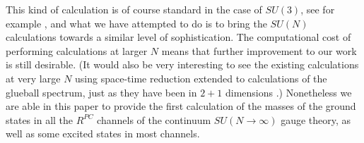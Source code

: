 \documentclass[12pt]{article}
\begin{document}
This kind of calculation is of course standard in the case of $SU(3)$, see for example
%
\cite{CMMT-1989,CM-UKQCD-1993,MP-1999,HM_Thesis,HMMT-2004,MP-2005,AAMT-2020},
%
and what we have attempted to do is to bring the $SU(N)$ calculations towards a similar level
of sophistication. The computational cost of performing calculations at larger
$N$ means that further improvement to our work is still desirable. 
(It would also be very interesting to see the existing calculations at very large $N$ using 
space-time reduction
%
\cite{MGPAGAMO-2020}
%
extended to calculations of the glueball spectrum, just as they have been in
$2+1$ dimensions
%
\cite{MGPAGAMKMO-2018}.)
%
Nonetheless we are able in this paper to provide the first calculation of the masses 
of the ground states in all the $R^{PC}$ channels of the continuum $SU(N\to\infty)$ gauge 
theory,  as well as some excited states in most channels.
\end{document}
